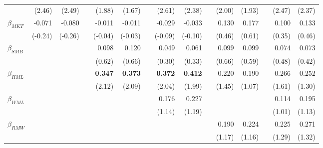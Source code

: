 \begin{singlespacing}
\begin{table}[h!]
\begin{tabular}{lrrrrrrrrrrrrrr}
      & (2.46)         & (2.49)         &           & (1.88)         & (1.67)         &           & (2.61)         & (2.38)         &  & (2.00)         & (1.93)         &  & (2.47)          & (2.37)         \\
$\beta_{MKT}$  & -0.071         & -0.080         &           & -0.011         & -0.011         &           & -0.029         & -0.033         &  & 0.130          & 0.177          &  & 0.100           & 0.133          \\
      & (-0.24)        & (-0.26)        &           & (-0.04)        & (-0.03)        &           & (-0.09)        & (-0.10)        &  & (0.46)         & (0.61)         &  & (0.35)          & (0.46)         \\
$\beta_{SMB}$ &                &                &           & 0.098          & 0.120          &           & 0.049          & 0.061          &  & 0.099          & 0.099          &  & 0.074           & 0.073          \\
      &                &                &           & (0.62)         & (0.66)         &           & (0.30)         & (0.33)         &  & (0.66)         & (0.59)         &  & (0.48)          & (0.42)         \\
$\beta_{HML}$  &                &                &           & \textbf{0.347} & \textbf{0.373} & \textbf{} & \textbf{0.372} & \textbf{0.412} &  & 0.220          & 0.190          &  & 0.266           & 0.252          \\
      &                &                &           & (2.12)         & (2.09)         &           & (2.04)         & (1.99)         &  & (1.45)         & (1.07)         &  & (1.61)          & (1.30)         \\
$\beta_{WML}$  &                &                &           &                &                &           & 0.176         & 0.227          &  &                &                &  & 0.114           & 0.195          \\
      &                &                &           &                &                &           & (1.14)        & (1.19)         &  &                &                &  & (1.01)          & (1.13)         \\
$\beta_{RMW}$ &                &                &           &                &                &           &                &                &  & 0.190          & 0.224          &  & 0.225           & 0.271          \\
      &                &                &           &                &                &           &                &                &  & (1.17)         & (1.16)         &  & (1.29)          & (1.32)         \\

\end{tabular}
\end{table}
\end{singlespacing}
